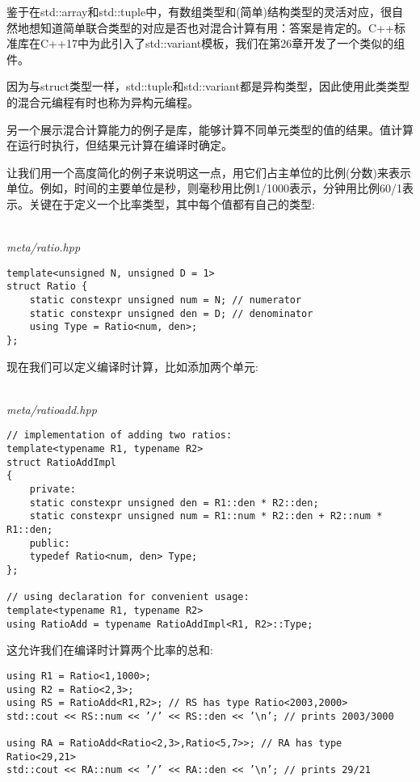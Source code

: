 鉴于在std::array和std::tuple中，有数组类型和(简单)结构类型的灵活对应，很自然地想知道简单联合类型的对应是否也对混合计算有用：答案是肯定的。C++标准库在C++17中为此引入了std::variant模板，我们在第26章开发了一个类似的组件。

因为与struct类型一样，std::tuple和std::variant都是异构类型，因此使用此类类型的混合元编程有时也称为异构元编程。


另一个展示混合计算能力的例子是库，能够计算不同单元类型的值的结果。值计算在运行时执行，但结果元计算在编译时确定。

让我们用一个高度简化的例子来说明这一点，用它们占主单位的比例(分数)来表示单位。例如，时间的主要单位是秒，则毫秒用比例1/1000表示，分钟用比例60/1表示。关键在于定义一个比率类型，其中每个值都有自己的类型:

\hspace*{\fill} \\ %
\noindent
\textit{meta/ratio.hpp}
\begin{lstlisting}[style=styleCXX]
template<unsigned N, unsigned D = 1>
struct Ratio {
	static constexpr unsigned num = N; // numerator
	static constexpr unsigned den = D; // denominator
	using Type = Ratio<num, den>;
};
\end{lstlisting}

现在我们可以定义编译时计算，比如添加两个单元:

\hspace*{\fill} \\ %
\noindent
\textit{meta/ratioadd.hpp}
\begin{lstlisting}[style=styleCXX]
// implementation of adding two ratios:
template<typename R1, typename R2>
struct RatioAddImpl
{
	private:
	static constexpr unsigned den = R1::den * R2::den;
	static constexpr unsigned num = R1::num * R2::den + R2::num * R1::den;
	public:
	typedef Ratio<num, den> Type;
};

// using declaration for convenient usage:
template<typename R1, typename R2>
using RatioAdd = typename RatioAddImpl<R1, R2>::Type;
\end{lstlisting}

这允许我们在编译时计算两个比率的总和:

\begin{lstlisting}[style=styleCXX]
using R1 = Ratio<1,1000>;
using R2 = Ratio<2,3>;
using RS = RatioAdd<R1,R2>; // RS has type Ratio<2003,2000>
std::cout << RS::num << ’/’ << RS::den << ’\n’; // prints 2003/3000

using RA = RatioAdd<Ratio<2,3>,Ratio<5,7>>; // RA has type Ratio<29,21>
std::cout << RA::num << ’/’ << RA::den << ’\n’; // prints 29/21
\end{lstlisting}

